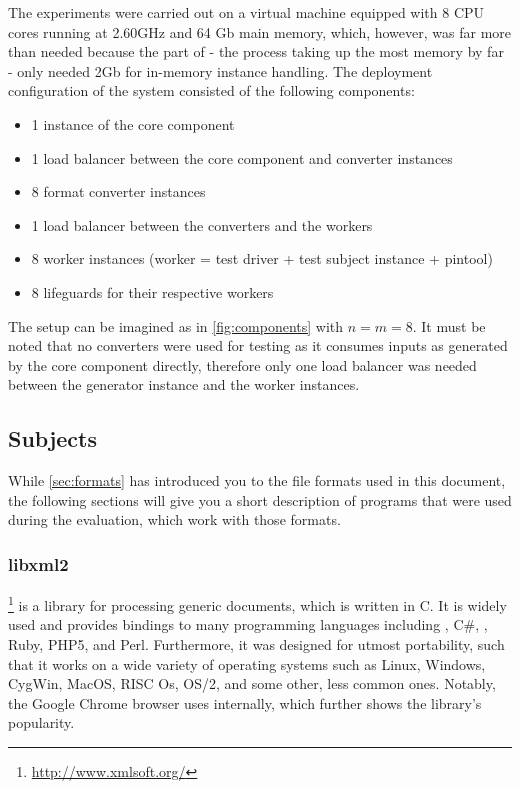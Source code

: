 The experiments were carried out on a virtual machine equipped with 8 CPU cores running at 2.60GHz and 64 Gb
main memory, which, however, was far more than needed because the \java part of \xmlmate{} - the process taking
up the most memory by far - only needed 2Gb for in-memory \xml instance handling. The deployment configuration
of the \xmlmate system consisted of the following components:

\begin{itemize}
  \item 1 instance of the \java \xmlmate core component
  \item 1 load balancer between the core component and converter instances
  \item 8 format converter instances
  \item 1 load balancer between the converters and the workers
  \item 8 worker instances (worker = test driver + test subject instance + pintool)
  \item 8 lifeguards for their respective workers
\end{itemize}

The setup can be imagined as in \cref{fig:components} with $n = m = 8$.
It must be noted that no converters were used for testing \libxml as it consumes inputs as generated
by the \xmlmate core component directly, therefore only one load balancer was needed between the generator
instance and the worker instances.

\subsection{Subjects}
While \cref{sec:formats} has introduced you to the file formats used in this document, the following sections
will give you a short description of programs that were used during the evaluation, which work with those
formats.
\tocless\subsubsection{libxml2}
\libxml\footnote{\url{http://www.xmlsoft.org/}} is a library for processing generic \xml documents,
which is written in {\small C}. It is widely used and provides bindings to many programming languages
including \cpp, {\small C\#}, \python{}, {\small Ruby}, {\small PHP5}, and {\small Perl}. Furthermore, it was
designed for utmost portability, such that it works on a wide variety of operating systems such as
Linux, Windows, CygWin, MacOS, RISC Os, OS/2, and some other, less common ones. Notably, the Google Chrome
browser uses \libxml internally, which further shows the library's popularity.

